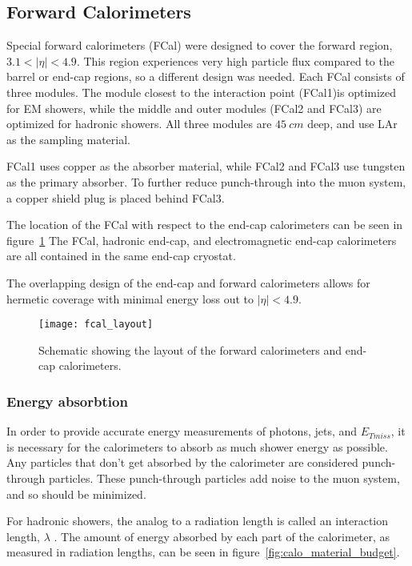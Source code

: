 \subsection{Forward Calorimeters}\label{subsec:fcal}

Special forward calorimeters (FCal) were designed to cover the forward region, $3.1 < |\eta| < 4.9$.
This region experiences very high particle flux compared to the barrel or end-cap regions, so a different design was needed.
Each FCal consists of three modules.
The module closest to the interaction point (FCal1)is optimized for EM showers,
while the middle and outer modules (FCal2 and FCal3) are optimized for hadronic showers.
All three modules are $45~cm$ deep, and use LAr as the sampling material.

FCal1 uses copper as the absorber material, while FCal2 and FCal3 use tungsten as the primary absorber.
To further reduce punch-through into the muon system, a copper shield plug is placed behind FCal3.

The location of the FCal with respect to the end-cap calorimeters can be seen in figure~\ref{fig:fcal_layout}
The FCal, hadronic end-cap, and electromagnetic end-cap calorimeters are all contained in the same end-cap cryostat.

The overlapping design of the end-cap and forward calorimeters allows for hermetic coverage with minimal energy loss out to $|\eta| < 4.9$.

\begin{figure}[!ht]\centering
\texttt{[image: fcal\_layout]}
\caption{Schematic showing the layout of the forward calorimeters and end-cap calorimeters.}
\label{fig:fcal_layout}\cite{atlas-detector-2008}
\end{figure}

\subsubsection{Energy absorbtion}
In order to provide accurate energy measurements of photons, jets, and $E_{Tmiss}$,
it is necessary for the calorimeters to absorb as much shower energy as possible.
Any particles that don't get absorbed by the calorimeter are considered punch-through particles.
These punch-through particles add noise to the muon system, and so should be minimized.

For hadronic showers, the analog to a radiation length is called an interaction length, $\lambda$ .
The amount of energy absorbed by each part of the calorimeter, as measured in radiation lengths, can be seen in figure~\ref{fig:calo_material_budget}.

